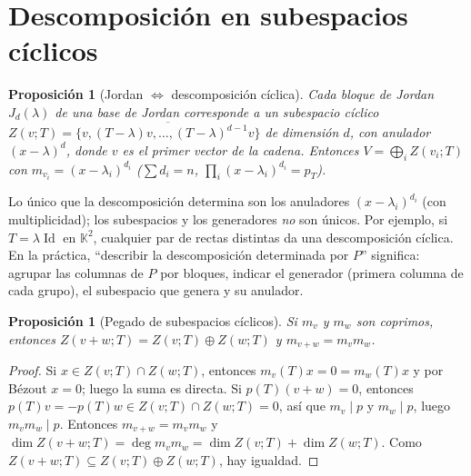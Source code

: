 \documentclass{article}
\newcommand{\K}{\mathbb{K}}
\newcommand{\gen}[1]{\overline{\{#1\}}}          %
\DeclareMathOperator{\Id}{Id}
\theoremstyle{plain}
\newtheorem{proposicion}[teorema]{Proposición}
\theoremstyle{definition}
\theoremstyle{remark}
\begin{document}
\section{Descomposición en subespacios cíclicos}

\begin{proposicion}[Jordan \(\iff\) descomposición cíclica]
    Cada bloque de Jordan \(J_d(\lambda)\) de una base de Jordan corresponde a un subespacio cíclico \(Z(v;T)=\gen{v,(T-\lambda)v,\dots,(T-\lambda)^{d-1}v}\) de dimensión \(d\), con anulador \((x-\lambda)^d\), donde \(v\) es el primer vector de la cadena. Entonces \(V=\bigoplus_iZ(v_i;T)\) con \(m_{v_i}=(x-\lambda_i)^{d_i}\) (\(\sum d_i=n\), \(\prod_i(x-\lambda_i)^{d_i}=p_T\)).
\end{proposicion}

Lo único que la descomposición determina son los anuladores \((x-\lambda_i)^{d_i}\) (con multiplicidad); los subespacios y los generadores \emph{no} son únicos. Por ejemplo, si \(T=\lambda\Id\) en \(\K^2\), cualquier par de rectas distintas da una descomposición cíclica. En la práctica, ``describir la descomposición determinada por \(P\)'' significa: agrupar las columnas de \(P\) por bloques, indicar el generador (primera columna de cada grupo), el subespacio que genera y su anulador.

\begin{proposicion}[Pegado de subespacios cíclicos]\label{prop:pegado}
    Si \(m_v\) y \(m_w\) son coprimos, entonces \(Z(v+w;T)=Z(v;T)\oplus Z(w;T)\) y \(m_{v+w}=m_vm_w\).
\end{proposicion}
\begin{proof}
    Si \(x\in Z(v;T)\cap Z(w;T)\), entonces \(m_v(T)x=0=m_w(T)x\) y por Bézout \(x=0\); luego la suma es directa. Si \(p(T)(v+w)=0\), entonces \(p(T)v=-p(T)w\in Z(v;T)\cap Z(w;T)=0\), así que \(m_v\mid p\) y \(m_w\mid p\), luego \(m_vm_w\mid p\). Entonces \(m_{v+w}=m_vm_w\) y \(\dim Z(v+w;T)=\deg m_vm_w=\dim Z(v;T)+\dim Z(w;T)\). Como \(Z(v+w;T)\subseteq Z(v;T)\oplus Z(w;T)\), hay igualdad.
\end{proof}
\end{document}
